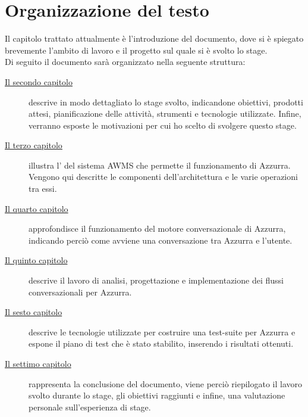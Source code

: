 \section{Organizzazione del testo}
Il capitolo trattato attualmente è l'introduzione del documento, dove si è spiegato brevemente l'ambito di lavoro e il progetto sul quale si è svolto lo stage.\\
Di seguito il documento sarà organizzato nella seguente struttura:
\begin{description}
    
    \item[{\hyperref[cap:descrizione-stage]{Il secondo capitolo}}] descrive in modo dettagliato lo stage svolto, indicandone obiettivi, prodotti attesi, pianificazione delle attività, strumenti e tecnologie utilizzate. Infine, verranno esposte le motivazioni per cui ho scelto di svolgere questo stage.
    
    \item[{\hyperref[cap:archittettura del sistema AWMS]{Il terzo capitolo}}] illustra l' del sistema \gls{AWMS} che permette il funzionamento di Azzurra. Vengono qui descritte le componenti dell'architettura e le varie operazioni tra essi.
    
    \item[{\hyperref[cap:flow engine]{Il quarto capitolo}}] approfondisce il funzionamento del motore conversazionale di Azzurra, indicando perciò come avviene una conversazione tra Azzurra e l'utente.
    
    \item[{\hyperref[cap:flussi di conversazione]{Il quinto capitolo}}] descrive il lavoro di analisi, progettazione e implementazione dei flussi conversazionali per Azzurra.
    
    \item[{\hyperref[cap:test]{Il sesto capitolo}}] descrive le tecnologie utilizzate per costruire una test-suite per Azzurra e espone il piano di test che è stato stabilito, inserendo i risultati ottenuti.
    
    \item[{\hyperref[cap:conclusioni]{Il settimo capitolo}}] rappresenta la conclusione del documento, viene perciò riepilogato il lavoro svolto durante lo stage, gli obiettivi raggiunti e infine, una valutazione personale sull'esperienza di stage.
\end{description}
